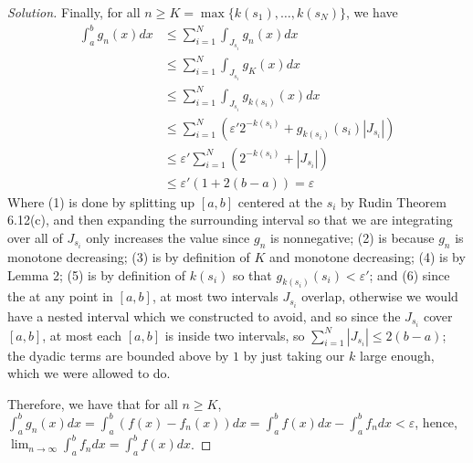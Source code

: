 \documentclass{article}
\newcommand{\ep}{{\varepsilon}}
\theoremstyle{remark}
\begin{document}
\begin{proof}[Solution]
	Finally, for all $n \geq K = \max\{k(s_1),\dots,k(s_N)\}$, we have
	\begin{align}
		\int_a^b g_n(x)dx
		&\leq \sum_{i=1}^N \int_{J_{s_i}} g_n(x)dx\\
		&\leq \sum_{i=1}^N \int_{J_{s_i}} g_K(x)dx\\
		&\leq \sum_{i=1}^N \int_{J_{s_i}} g_{k(s_i)}(x)dx\\
		&\leq \sum_{i=1}^N \left(\ep'2^{-k(s_i)} + g_{k(s_i)}(s_i)|J_{s_i}|\right)\\
		&\leq \ep'\sum_{i=1}^N \left(2^{-k(s_i)} + |J_{s_i}|\right)\\
		&\leq \ep'(1 + 2(b-a)) = \ep
	\end{align}
	Where (1) is done by splitting up $[a,b]$ centered at the $s_i$ by Rudin Theorem 6.12(c),
	and then expanding the surrounding interval so that we are integrating
	over all of $J_{s_i}$ only increases the value since $g_n$ is nonnegative;
	(2) is because $g_n$ is monotone decreasing;
	(3) is by definition of $K$ and monotone decreasing;
	(4) is by Lemma 2;
	(5) is by definition of $k(s_i)$ so that $g_{k(s_i)}(s_i) < \ep'$; and
	(6) since the at any point in $[a,b]$, at most two intervals $J_{s_i}$ overlap,
	otherwise we would have a nested interval which we constructed to avoid,
	and so since the $J_{s_i}$ cover $[a,b]$, at most each $[a,b]$
	is inside two intervals, so $\sum_{i=1}^N |J_{s_i}| \leq 2(b-a)$;
	the dyadic terms are bounded above by $1$ by just taking our $k$ large enough, which we were allowed to do.

	Therefore, we have that for all $n \geq K$,
	$\int_a^b g_n(x)dx = \int_a^b (f(x) - f_n(x))dx
	= \int_a^b f(x)dx - \int_a^b f_ndx < \ep$,
	hence, $\lim_{n\to\infty} \int_a^b f_ndx = \int_a^b f(x)dx$.
\end{proof}
\end{document}
